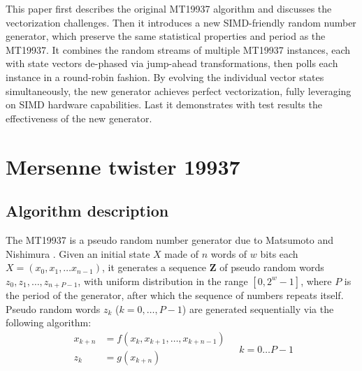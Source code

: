 \documentclass[preprint,1p,times]{elsarticle}
\begin{document}
This paper first describes the original MT19937 algorithm and discusses the vectorization challenges. Then it introduces a new SIMD-friendly random number generator, which preserve the same statistical properties and period as the MT19937. It combines the random streams of multiple MT19937 instances, each with state vectors de-phased via jump-ahead transformations, then polls each instance in a round-robin fashion. By evolving the individual vector states simultaneously, the new generator achieves perfect vectorization, fully leveraging on SIMD hardware capabilities. Last it demonstrates with test results the effectiveness of the new generator.

\section{Mersenne twister 19937}
\label{sec:mt19937}
\subsection{Algorithm description}
The MT19937 is a pseudo random number generator due to Matsumoto and Nishimura \cite{mt19937}.
Given an initial state $X$ made of $n$ words of $w$ bits each $X=(x_0, x_1, \dots x_{n-1})$, it generates a sequence $\boldsymbol{Z}$ of pseudo random words $z_{0}, z_{1}, \dots, z_{n+P-1}$, with uniform distribution in the range $[0, 2^w-1]$, where $P$ is the period of the generator, after which the sequence of numbers repeats itself. \\

Pseudo random words $z_k$ ($k=0, \dots, P-1$) are generated sequentially via the following algorithm:
\begin{equation}
\label{eq:formula}
\begin{aligned}
    x_{k+n} &= f(x_{k}, x_{k+1},\dots, x_{k+n-1}) \\
    z_k &= g(x_{k+n}) \\
\end{aligned}
\quad k=0\dots P-1
\end{equation}
\end{document}
